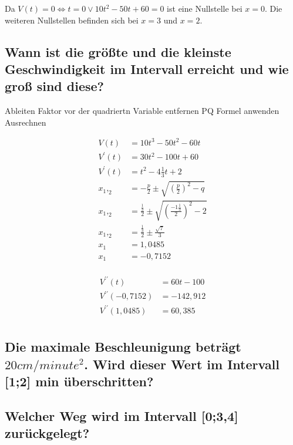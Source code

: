 \documentclass[a4paper,11pt]{scrartcl}
\begin{document}
Da $V(t) = 0 \Leftrightarrow t = 0 \vee 10t^2 - 50t + 60 = 0$ ist eine
Nullstelle bei $x = 0$. Die weiteren Nullstellen befinden sich bei $x = 3$ und
$x = 2$.

\subsection{Wann ist die grö{\ss}te und die kleinste Geschwindigkeit im
Intervall erreicht und wie gro{\ss} sind diese?}

\begin{outline}
  \1 Ableiten
  \1 Faktor vor der quadriertn Variable entfernen
  \1 PQ Formel anwenden
  \1 Ausrechnen
\end{outline}

\begin{align*}
  V(t) &= 10t^3 - 50t^2 - 60t                               \\
  V^\prime(t) &= 30t^2 - 100t + 60  \\
  V^\prime(t) &= t^2  - 4\frac{1}{3}t + 2  \\
  x_1,_2 &= -\frac{p}{2} \pm \sqrt{\left(\frac{p}{2}\right)^2 - q} \\
  x_1,_2 &= \frac{\frac{1}{3}}{2} \pm \sqrt{\left(\frac{-1\frac{1}{3}}{2}\right)^2 - 2} \\
  x_1,_2 &= \frac{\frac{1}{3}}{2} \pm \frac{{\sqrt{7}}}{3} \\
  x_1   &= 1,0485  \\
  x_1   &= -0,7152  \\
\end{align*}

\begin{align*}
  V^{\prime\prime}(t) &= 60t - 100      \\
  V^{\prime\prime}(-0,7152) &= -142,912 \\
  V^{\prime\prime}(1,0485) &= 60,385    \\
\end{align*}

\subsection{Die maximale Beschleunigung beträgt $20cm / minute^2$. Wird dieser
Wert im Intervall [1;2] min überschritten?}

\subsection{Welcher Weg wird im Intervall [0;3,4] zurückgelegt?}
\end{document}
